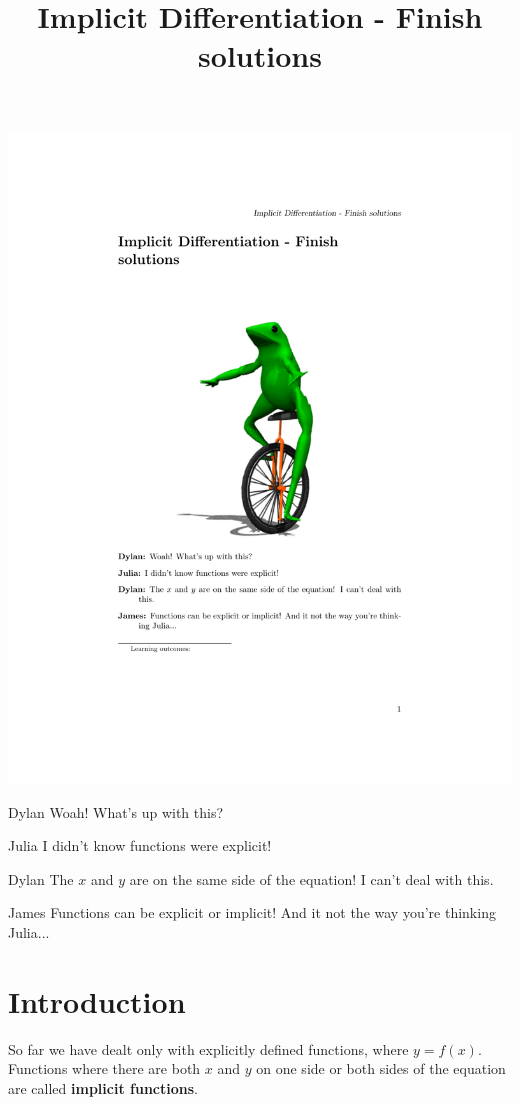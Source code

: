 \documentclass{ximera}
\title{Implicit Differentiation - Finish solutions}
\begin{document}
\maketitle
\begin{image}
\includegraphics{implicit_differentiation}
\end{image}
\begin{dialogue}
\item[Dylan] Woah! What's up with this?
\item[Julia] I didn't know functions were explicit!
\item[Dylan] The $x$ and $y$ are on the same side of the equation! I can't deal with this.
\item[James] Functions can be explicit or implicit! And it not the way you're thinking Julia...
\end{dialogue}
\section{Introduction}
So far we have dealt only with explicitly defined functions, where $y=f(x)$.  Functions where there are both $x$ and $y$ on one side or both sides of the equation are called \textbf{implicit functions}.
\end{document}
